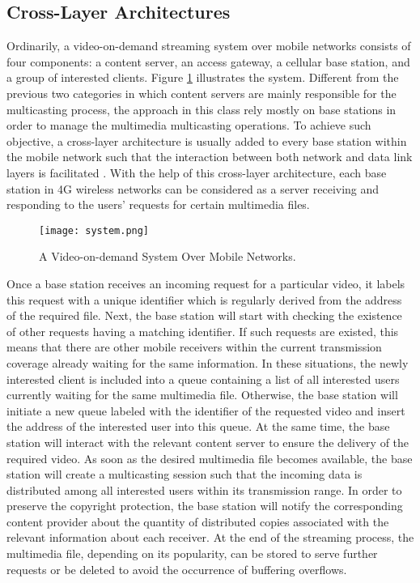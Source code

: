 \subsection{Cross-Layer Architectures}
Ordinarily, a video-on-demand streaming system over mobile networks consists of four components: a content server, an access gateway, a cellular base station, and a group of interested clients. Figure \ref{system} illustrates the system. Different from the previous two categories in which content servers are mainly responsible for the multicasting process, the approach in this class rely mostly on base stations in order to manage the multimedia multicasting operations. To achieve such objective, a cross-layer architecture is usually added to every base station within the mobile network such that the interaction between both network and data link layers is facilitated \cite{ref22}. With the help of this cross-layer architecture, each base station in 4G wireless networks can be considered as a server receiving and responding to the users’ requests for certain multimedia files. 

\begin{figure}[!t]
\centering
\texttt{[image: system.png]}
\caption{A Video-on-demand System Over Mobile Networks.}
\label{system}
\end{figure}
Once a base station receives an incoming request for a particular video, it labels this request with a unique identifier which is regularly derived from the address of the required file. Next, the base station will start with checking the existence of other requests having a matching identifier. If such requests are existed, this means that there are other mobile receivers within the current transmission coverage already waiting for the same information. In these situations, the newly interested client is included into a queue containing a list of all interested users currently waiting for the same multimedia file. Otherwise, the base station will initiate a new queue labeled with the identifier of the requested video and insert the address of the interested user into this queue. At the same time, the base station will interact with the relevant content server to ensure the delivery of the required video. As soon as the desired multimedia file becomes available, the base station will create a multicasting session such that the incoming data is distributed among all interested users within its transmission range. In order to preserve the copyright protection, the base station will notify the corresponding content provider about the quantity of distributed copies associated with the relevant information about each receiver. At the end of the streaming process, the multimedia file, depending on its popularity, can be stored to serve further requests or be deleted to avoid the occurrence of buffering overflows.

